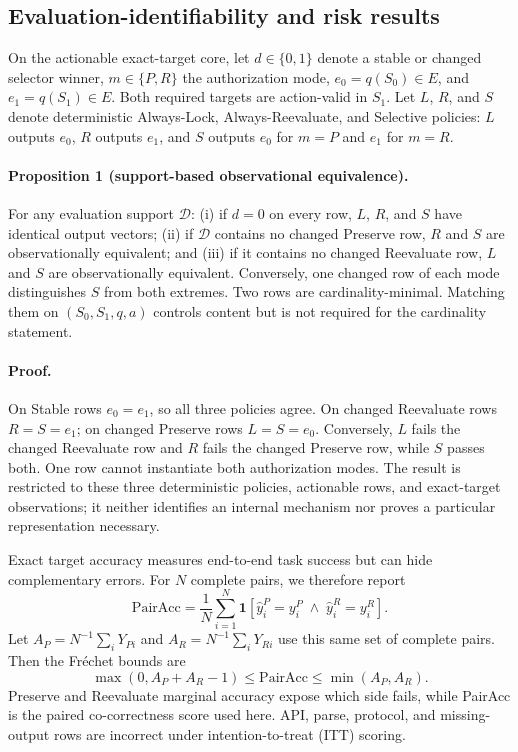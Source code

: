 \documentclass[10pt]{article}
\begin{document}
\subsection{Evaluation-identifiability and risk results}
On the actionable exact-target core, let $d\in\{0,1\}$ denote a stable or changed selector winner,
$m\in\{P,R\}$ the authorization mode, $e_0=q(S_0)\in E$, and $e_1=q(S_1)\in E$. Both required
targets are action-valid in $S_1$. Let $L$, $R$, and $S$ denote deterministic Always-Lock,
Always-Reevaluate, and Selective policies: $L$ outputs $e_0$, $R$ outputs $e_1$, and $S$ outputs
$e_0$ for $m=P$ and $e_1$ for $m=R$.

\paragraph{Proposition 1 (support-based observational equivalence).}
For any evaluation support $\mathcal D$: (i) if $d=0$ on every row, $L$, $R$, and $S$ have
identical output vectors; (ii) if $\mathcal D$ contains no changed Preserve row, $R$ and $S$ are
observationally equivalent; and (iii) if it contains no changed Reevaluate row, $L$ and $S$ are
observationally equivalent. Conversely, one changed row of each mode distinguishes $S$ from both
extremes. Two rows are cardinality-minimal. Matching them on $(S_0,S_1,q,a)$ controls content but
is not required for the cardinality statement.

\paragraph{Proof.}
On Stable rows $e_0=e_1$, so all three policies agree. On changed Reevaluate rows $R=S=e_1$; on
changed Preserve rows $L=S=e_0$. Conversely, $L$ fails the changed Reevaluate row and $R$ fails
the changed Preserve row, while $S$ passes both. One row cannot instantiate both authorization
modes. The result is restricted to these three deterministic policies, actionable rows, and
exact-target observations; it neither identifies an internal mechanism nor proves a particular
representation necessary.

Exact target accuracy measures end-to-end task success but can hide complementary errors.
For $N$ complete pairs, we therefore report
\[
\mathrm{PairAcc}=\frac{1}{N}\sum_{i=1}^N
\mathbf{1}[\hat y_i^P=y_i^P\;\wedge\;\hat y_i^R=y_i^R].
\]
Let $A_P=N^{-1}\sum_iY_{Pi}$ and $A_R=N^{-1}\sum_iY_{Ri}$ use this same set of complete pairs.
Then the Fr\'echet bounds are
\[
\max(0,A_P+A_R-1)\leq\mathrm{PairAcc}\leq\min(A_P,A_R).
\]
Preserve and Reevaluate marginal accuracy expose which side fails, while PairAcc is the paired
co-correctness score used here. API, parse, protocol, and missing-output rows are incorrect under
intention-to-treat (ITT) scoring.
\end{document}
